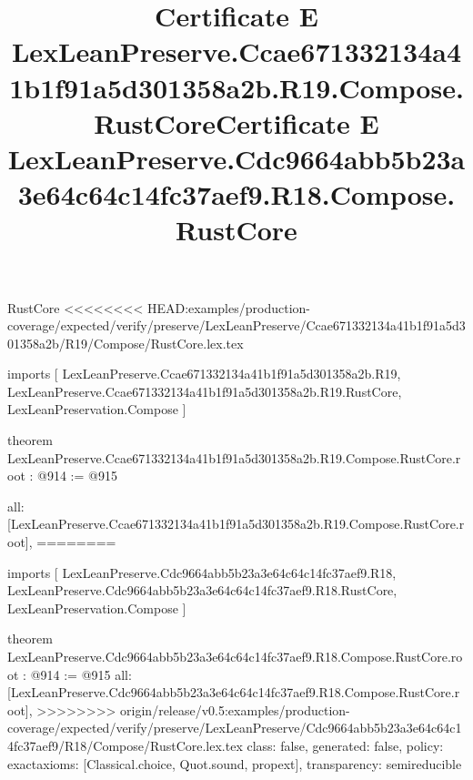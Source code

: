\begin{lexlean}{RustCore}
<<<<<<<< HEAD:examples/production-coverage/expected/verify/preserve/LexLeanPreserve/Ccae671332134a41b1f91a5d301358a2b/R19/Compose/RustCore.lex.tex
\title{Certificate E LexLeanPreserve.Ccae671332134a41b1f91a5d301358a2b.R19.Compose.RustCore}
\begin{coremodule}
imports [
  LexLeanPreserve.Ccae671332134a41b1f91a5d301358a2b.R19,
  LexLeanPreserve.Ccae671332134a41b1f91a5d301358a2b.R19.RustCore,
  LexLeanPreservation.Compose
]

theorem LexLeanPreserve.Ccae671332134a41b1f91a5d301358a2b.R19.Compose.RustCore.root : @914 := @915 {
  all: [LexLeanPreserve.Ccae671332134a41b1f91a5d301358a2b.R19.Compose.RustCore.root],
========
\title{Certificate E LexLeanPreserve.Cdc9664abb5b23a3e64c64c14fc37aef9.R18.Compose.RustCore}
\begin{coremodule}
imports [
  LexLeanPreserve.Cdc9664abb5b23a3e64c64c14fc37aef9.R18,
  LexLeanPreserve.Cdc9664abb5b23a3e64c64c14fc37aef9.R18.RustCore,
  LexLeanPreservation.Compose
]

theorem LexLeanPreserve.Cdc9664abb5b23a3e64c64c14fc37aef9.R18.Compose.RustCore.root : @914 := @915 {
  all: [LexLeanPreserve.Cdc9664abb5b23a3e64c64c14fc37aef9.R18.Compose.RustCore.root],
>>>>>>>> origin/release/v0.5:examples/production-coverage/expected/verify/preserve/LexLeanPreserve/Cdc9664abb5b23a3e64c64c14fc37aef9/R18/Compose/RustCore.lex.tex
  class: false,
  generated: false,
  policy: exact{axioms: [Classical.choice, Quot.sound, propext]},
  transparency: semireducible
}


\end{coremodule}}
\end{coremodule}
\end{lexlean}
